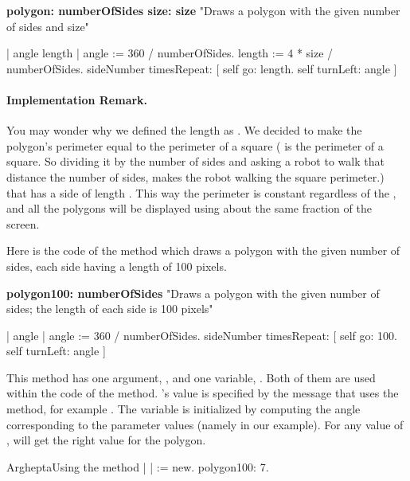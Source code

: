 \begin{method}\label{mth:fixedSizePolygon}
\textbf{polygon: numberOfSides size: size}
    "Draws a polygon with the given number of sides and size"

    | angle length |
    angle := 360 / numberOfSides.
    length := 4 * size / numberOfSides.
    sideNumber timesRepeat: 
                               [ self go: length.
                               self turnLeft: angle ]
\end{method}

\paragraph{Implementation Remark.} You may wonder why we defined the length as . We decided to make the polygon's perimeter equal to the perimeter of a square ( is the perimeter of a square. So dividing it by the number of sides and asking a robot to walk that distance the number of sides, makes the robot walking the square perimeter.) that has a side of length . This way the perimeter is constant regardless of the , and all the polygons will be displayed using about the same fraction of the screen. 

Here is the code of the method  which draws a polygon with the given number of sides, each side having a length of 100 pixels.

\begin{method}\label{mth:regularPolygon}
\textbf{polygon100: numberOfSides}
    "Draws a polygon with the given number of sides; the length of each
    side is 100 pixels"

    | angle |
    angle := 360 / numberOfSides.
    sideNumber timesRepeat: 
                               [ self go: 100.
                               self turnLeft: angle ]
\end{method}

This method has one argument, , and one variable, . Both of them are used within the code of the method. 's value is specified by the message that uses the method, for example . The variable  is initialized by computing the angle corresponding to the parameter values (namely  in our example). For any value of ,  will get the right value for the polygon.

\begin{scriptfig}{Arghepta}{Using the method }\label{src:heptagon}
| \caro |
\caro := \Turtle new.
\caro polygon100: 7.
\end{scriptfig}

